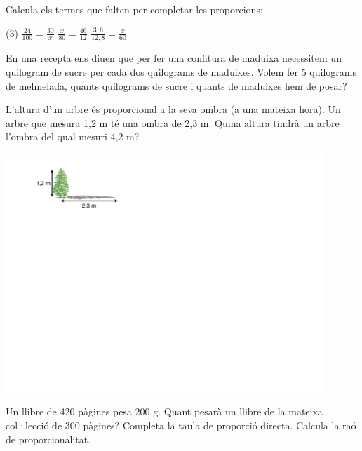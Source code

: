 \begin{mylist}
\exer
  Calcula els termes que falten per completar les proporcions:
	\begin{tasks}(3)
		\task $\frac{24}{100}=\frac{30}{x}$
		\task $\frac{x}{80}=\frac{46}{12}$
		\task $\frac{3,6}{12,8}= \frac{x}{60}$	
	\end{tasks}

\answers{[125, $\frac{920}{3}=306.666$, 16.875]}

\exer
  En una recepta ens diuen que per fer una confitura de maduixa
  necessitem un quilogram de sucre per cada dos quilograms de maduixes.
  Volem fer 5 quilograms de melmelada, quants quilograms de sucre i
  quants de maduixes hem de posar?

  
\vspace{-1.25cm}
\exer \begin{minipage}[t]{0.7\textwidth}
	  L'altura d'un arbre és proporcional a la seva ombra (a una mateixa
	hora). Un arbre que mesura 1,2 m té una ombra de 2,3 m. Quina altura
	tindrà un arbre l'ombra del qual mesuri 4,2 m?
\end{minipage}
\begin{minipage}{0.3\textwidth}
	\centering
	\vspace{1.5cm}
	\includegraphics[width=0.9\textwidth]{img-07/arbre}
\end{minipage}

 

\exer
  Un llibre de 420 pàgines pesa 200 g. Quant pesarà un llibre de la
  mateixa col·lecció de 300 pàgines?
\exer \spen
  Completa la taula de proporció directa.
  Calcula la raó de proporcionalitat.
 

\end{mylist}
